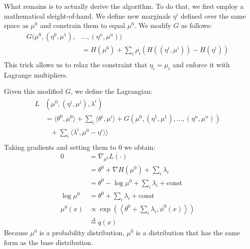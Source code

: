\documentclass[times, 10pt,twocolumn]{article}
\begin{document}
What remains is to actually derive the algorithm. To do that, we
first employ a mathematical sleight-of-hand. We define new
marginals $\eta^i$ defined over the same space as $\mu^0$ and
constrain them to equal $\mu^0$. We modify $G$ as follows:
\begin{equation*}
  \begin{split}
     G (\mu^0,(\eta^0,\mu^1),&\ldots,(\eta^n,\mu^n) )\\
     &= H(\mu^0) + \sum_i \rho_i \left( H( (\eta^i, \mu^i)) -
     H(\eta^i) \right )  \\ 
   \end{split}
 \end{equation*}
This trick allows us to relax the constraint that $\eta_i = \mu_i$
and enforce it with Lagrange multipliers.

Given this modified $G$, we define the Lagrangian:
\begin{equation}
  \begin{split}
     L&(\mu^0,(\eta^i,\mu^i), \lambda^i) \\
     &= \langle\theta^0,\mu^0\rangle + \sum_i \langle
     \theta^i,\mu^i\rangle  +G(\mu^0, (\eta^1, \mu^1), \ldots,
     (\eta^n,\mu^n)) \\
     &\phantom{\cdots}+ \sum_i \langle \lambda^i, \mu^0 -
     \eta^i\rangle
     \rangle \\
   \end{split}
 \end{equation}
Taking gradients and setting them to 0 we obtain:
\begin{equation*}
  \begin{split}
    0 &= \nabla_{\mu^0} L(\cdot) \\
    &= \theta^0 + \nabla H(\mu^0) + \sum_i
    \lambda_i \\
    &= \theta^0  - \log \mu^0 + \sum_i \lambda_i + \mathrm{const} \\
    \log \mu^0 &= \theta^0  + \sum_i \lambda_i + \mathrm{const} \\ 
    \mu^0(x) &\propto \exp(\left \langle \theta^0  + \sum_i \lambda_i, \phi^0(x) \right\rangle)\\
    &\stackrel{\Delta}{=} q(x)
   \end{split}
 \end{equation*}
Because $\mu^0$  is a probability distribution, $\mu^0$ is a
distribution that has the same form as the base distribution.
\end{document}
